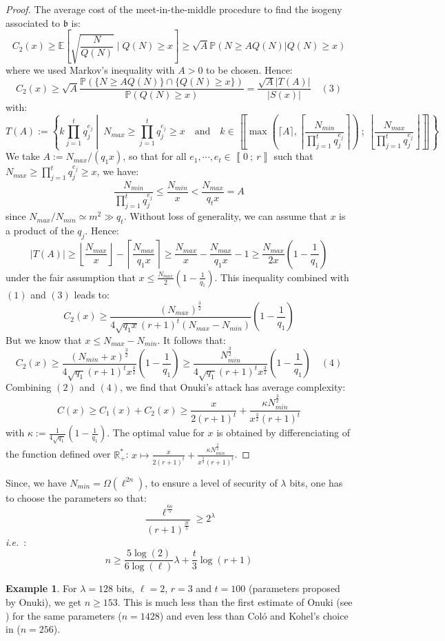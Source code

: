 \documentclass[a4paper,10pt]{report}
\theoremstyle{definition}
\theoremstyle{plain}
\theoremstyle{definition}
\newtheorem{example}[definition]{Example}
\newcommand{\ie}{\emph{i.e.}\ }
\newcommand{\R}{\mathbb{R}}
\newcommand{\E}{\mathbb{E}}
\renewcommand{\i}[2]{\left\llbracket #1~;~#2\right\rrbracket}
\renewcommand{\(}{\left(}
\renewcommand{\)}{\right)}
\renewcommand{\P}{\mathbb{P}}
\newcommand{\mf}[1]{\mathfrak{#1}}
\begin{document}
\begin{proof}
The average cost of the meet-in-the-middle procedure to find the isogeny associated to $\mf{b}$ is:
\[C_2(x)\geq \E\left[\sqrt{\frac{N}{Q(N)}}\mid Q(N)\geq x\right]\geq \sqrt{A}\P(N\geq A Q(N)|Q(N)\geq x)\]
where we used Markov's inequality with $A>0$ to be chosen. Hence:
\[C_2(x)\geq  \sqrt{A}\frac{\P(\{N\geq A Q(N)\}\cap\{Q(N)\geq x\})}{\P(Q(N)\geq x)}=\frac{\sqrt{A}|T(A)|}{|S(x)|} \quad (3)\]
with:
\[T(A):=\left\{k\prod_{j=1}^tq_j^{e_j}\middle| \ N_{max}\geq\prod_{j=1}^tq_j^{e_j}\geq x \quad \mbox{and} \quad k\in\i{\max\(\lceil A\rceil,\left\lceil\frac{N_{min}}{\prod_{j=1}^t q_j^{e_j}}\right\rceil\)}{\left\lfloor\frac{N_{max}}{\prod_{j=1}^t q_j^{e_j}}\right\rfloor}\right\}\]
We take $A:=N_{max}/(q_1 x)$, so that for all $e_1, \cdots,e_t\in\i{0}{r}$ such that $N_{max}\geq \prod_{j=1}^tq_j^{e_j}\geq x$, we have:
\[\frac{N_{min}}{\prod_{j=1}^tq_j^{e_j}}\leq \frac{N_{min}}{x}<\frac{N_{max}}{q_tx}=A\]
since $N_{max}/N_{min}\simeq m^2\gg q_t$. Without loss of generality, we can assume that $x$ is a product of the $q_j$. Hence:
\[|T(A)|\geq\left\lfloor\frac{N_{max}}{x}\right\rfloor-\left\lceil\frac{N_{max}}{q_1x}\right\rceil\geq \frac{N_{max}}{x}-\frac{N_{max}}{q_1x}-1\geq\frac{N_{max}}{2x}\(1-\frac{1}{q_1}\)\]
under the fair assumption that $x\leq \frac{N_{max}}{2}\(1-\frac{1}{q_1}\)$. This inequality combined with $(1)$ and $(3)$ leads to:
\[C_2(x)\geq \frac{(N_{max})^{\frac{3}{2}}}{4\sqrt{q_1 x}(r+1)^t(N_{max}-N_{min})}\(1-\frac{1}{q_1}\)\]
But we know that $x\leq N_{max}-N_{min}$. It follows that:
\[C_2(x)\geq  \frac{(N_{min}+x)^{\frac{3}{2}}}{4\sqrt{q_1}(r+1)^tx^{\frac{3}{2}}}\(1-\frac{1}{q_1}\)\geq \frac{N_{min}^{\frac{3}{2}}}{4\sqrt{q_1}(r+1)^tx^{\frac{3}{2}}}\(1-\frac{1}{q_1}\)\quad (4)\]
Combining $(2)$ and $(4)$, we find that Onuki's attack has average complexity:
\[C(x)\geq C_1(x)+C_2(x)\geq  \frac{x}{2(r+1)^t}+\frac{\kappa N_{min}^{\frac{3}{2}}}{x^{\frac{3}{2}}(r+1)^t}\]
with $\kappa:=\frac{1}{4\sqrt{q_1}}\(1-\frac{1}{q_1}\)$. The optimal value for $x$ is obtained by differenciating of the function defined over $\R_+^*$:  $x\longmapsto \frac{x}{2(r+1)^t}+\frac{\kappa N_{min}^{\frac{3}{2}}}{x^{\frac{3}{2}}(r+1)^t}$.
\end{proof}

Since, we have $N_{min}=\Omega(\ell^{2n})$, to ensure a level of security of $\lambda$ bits, one has to choose the parameters so that:
\[\frac{\ell^{\frac{6n}{5}}}{(r+1)^{\frac{2t}{5}}}\geq 2^\lambda\]
\ie:
\[n\geq \frac{5\log(2)}{6\log(\ell)}\lambda+\frac{t}{3}\log(r+1)\]

\begin{example}
For $\lambda=128$ bits, $\ell=2$, $r=3$ and $t=100$ (parameters proposed by Onuki), we get $n\geq 153$. This is much less than the first estimate of Onuki (see \cite[§ 6.3]{Onuki}) for the same parameters ($n=1428$) and even less than Col\'{o} and Kohel's choice in \cite[section 6]{OSIDH} ($n=256$).
\end{example}
\end{document}
